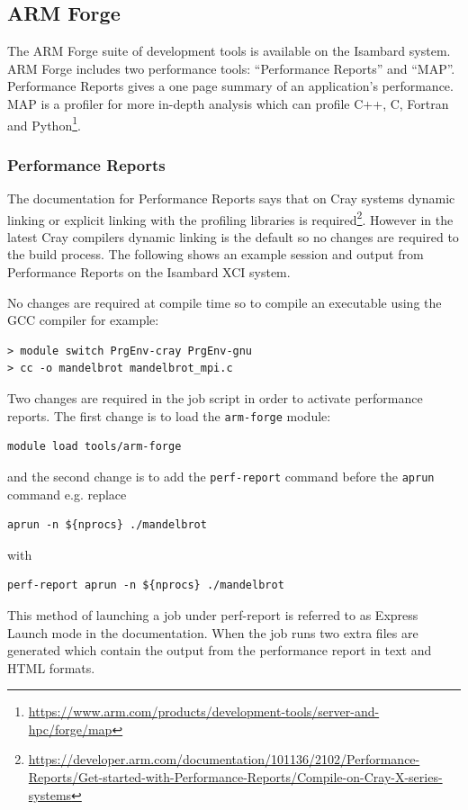 \documentclass[a4paper,titlepage]{article}
\begin{document}
\pagebreak

\subsection{ARM Forge}

The ARM Forge suite of development tools is available on the Isambard system. ARM Forge includes two performance tools: ``Performance Reports'' and ``MAP''. Performance Reports gives a one page summary of an application's performance. MAP is a profiler for more in-depth analysis which can profile C++, C, Fortran and Python\footnote{\url{https://www.arm.com/products/development-tools/server-and-hpc/forge/map}}. 

\subsubsection{Performance Reports}

The documentation for Performance Reports says that on Cray systems dynamic linking or explicit linking with the profiling libraries is required\footnote{\url{https://developer.arm.com/documentation/101136/2102/Performance-Reports/Get-started-with-Performance-Reports/Compile-on-Cray-X-series-systems}}. However in the latest Cray compilers dynamic linking is the default so no changes are required to the build process. The following shows an example session and output from Performance Reports on the Isambard XCI system.

No changes are required at compile time so to compile an executable using the GCC compiler for example:
\begin{verbatim}
> module switch PrgEnv-cray PrgEnv-gnu
> cc -o mandelbrot mandelbrot_mpi.c
\end{verbatim}
Two changes are required in the job script in order to activate performance reports. The first change is to load the \texttt{arm-forge} module:
\begin{verbatim}
module load tools/arm-forge
\end{verbatim}
and the second change is to add the \texttt{perf-report} command before the \texttt{aprun} command e.g. replace
\begin{verbatim}
aprun -n ${nprocs} ./mandelbrot
\end{verbatim}
with
\begin{verbatim}
perf-report aprun -n ${nprocs} ./mandelbrot
\end{verbatim}
This method of launching a job under perf-report is referred to as Express Launch mode in the documentation.
%
When the job runs two extra files are generated which contain the output from the performance report in text and HTML formats. \\
\end{document}
